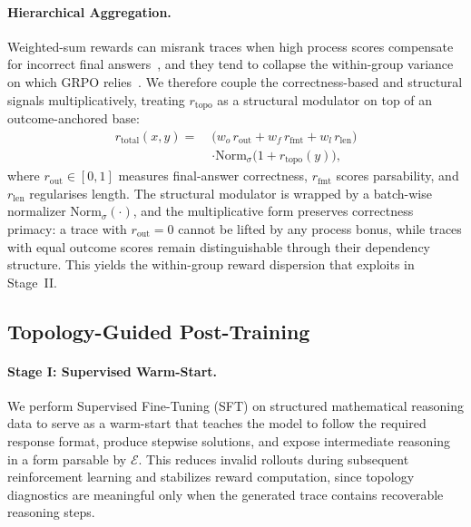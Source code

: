 \paragraph{Hierarchical Aggregation.}
Weighted-sum rewards can misrank traces when high process scores compensate for incorrect final answers~\citep{Denison2024SycophancyTS}, and they tend to collapse the within-group variance on which GRPO relies~\citep{yu2025dapo,kazemnejad2025vineppo}. We therefore couple the correctness-based and structural signals multiplicatively, treating $r_{\mathrm{topo}}$ as a structural modulator on top of an outcome-anchored base:
\begin{equation}
\label{eq:r_total}
\begin{aligned}
r_{\mathrm{total}}(x,y)=\;
&\bigl(w_o\,r_{\mathrm{out}}+w_f\,r_{\mathrm{fmt}}+w_l\,r_{\mathrm{len}}\bigr)\\
&\cdot \mathrm{Norm}_{\sigma}\! \bigl(1+r_{\mathrm{topo}}(y)\bigr),
\end{aligned}
\end{equation}
where $r_{\mathrm{out}}\!\in\![0,1]$ measures final-answer correctness, $r_{\mathrm{fmt}}$ scores parsability, and $r_{\mathrm{len}}$ regularises length. The structural modulator is wrapped by a batch-wise normalizer $\mathrm{Norm}_{\sigma}(\cdot)$, and the multiplicative form preserves correctness primacy: a trace with $r_{\mathrm{out}}\!=\!0$ cannot be lifted by any process bonus, while traces with equal outcome scores remain distinguishable through their dependency structure. This yields the within-group reward dispersion that \estimation exploits in Stage~II.

\subsection{Topology-Guided Post-Training}
\label{sec:post_training}

\paragraph{Stage I: Supervised Warm-Start.}
We perform Supervised Fine-Tuning (SFT) on structured mathematical reasoning data to serve as a warm-start that teaches the model to follow the required response format, produce stepwise solutions, and expose intermediate reasoning in a form parsable by $\mathcal{E}$. This reduces invalid rollouts during subsequent reinforcement learning and stabilizes reward computation, since topology diagnostics are meaningful only when the generated trace contains recoverable reasoning steps.


